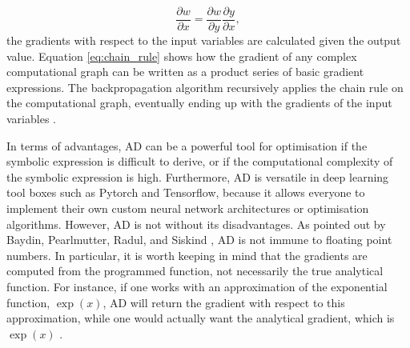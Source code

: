 \begin{equation}\label{eq:chain_rule}
    \frac{\partial w}{\partial x} = \frac{\partial w}{\partial y} \frac{\partial y}{\partial x},
\end{equation}
the gradients with respect to the input variables are calculated given the output value.
Equation \eqref{eq:chain_rule} shows how the gradient of any complex computational graph can be written as a product series of basic gradient expressions.
The backpropagation algorithm recursively applies the chain rule on the computational graph, eventually ending up with the gradients of the input variables \cite{baydin2018automatic}.

In terms of advantages, AD can be a powerful tool for optimisation if the symbolic expression is difficult to derive, or if the computational complexity of the symbolic expression is high.
Furthermore, AD is versatile in deep learning tool boxes such as Pytorch and Tensorflow,
because it allows everyone to implement their own custom neural network architectures or optimisation algorithms.
However, AD is not without its disadvantages. As pointed out by Baydin, Pearlmutter, Radul, and Siskind \cite{baydin2018automatic},
AD is not immune to floating point numbers.
In particular, it is worth keeping in mind that the gradients are computed from the programmed function, not necessarily the true analytical function.
For instance, if one works with an approximation of the exponential function, $\exp(x)$, AD will return the gradient with respect to this approximation,
while one would actually want the analytical gradient, which is $\exp(x)$ \cite{baydin2018automatic}. %







